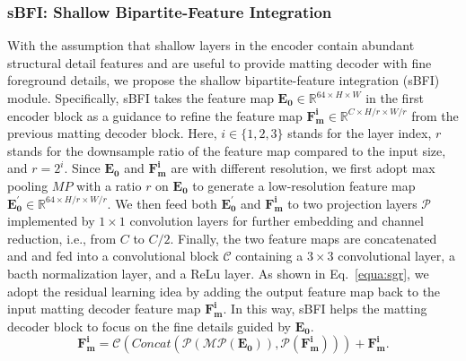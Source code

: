 \documentclass[twocolumn]{svjour3}
\begin{document}
\subsubsection{sBFI: Shallow Bipartite-Feature Integration}
With the assumption that shallow layers in the encoder contain abundant structural detail features and are useful to provide matting decoder with fine foreground details, we propose the shallow bipartite-feature integration (sBFI) module. Specifically, sBFI takes the feature map $\mathbf{E_0}\in \mathbb{R}^{64\times H \times W}$ in the first encoder block as a guidance to refine the feature map $\mathbf{F_m^i}\in\mathbb{R}^{C\times H/r \times W/r}$ from the previous matting decoder block. Here, $i\in \{1,2,3\}$ stands for the layer index, $r$ stands for the downsample ratio of the feature map compared to the input size, and $r=2^i$. Since $\mathbf{E_0}$ and $\mathbf{F_m^i}$ are with different resolution, we first adopt max pooling $MP$ with a ratio $r$ on $\mathbf{E_0}$ to generate a low-resolution feature map $\mathbf{E_0^{'}}\in \mathbb{R}^{64\times H/r \times W/r}$. We then feed both $\mathbf{E_0^{'}}$ and $\mathbf{F_m^i}$ to two projection layers $\mathcal{P}$ implemented by $1\times1$ convolution layers for further embedding and channel reduction, i.e., from $C$ to $C/2$. Finally, the two feature maps are concatenated and and fed into a convolutional block $\mathcal{C}$ containing a $3\times3$ convolutional layer, a bacth normalization layer, and a ReLu layer. As shown in Eq.~\ref{equa:sgr}, we adopt the residual learning idea by adding the output feature map back to the input matting decoder feature map $\mathbf{F_m^i}$. In this way, sBFI helps the matting decoder block to focus on the fine details guided by $\mathbf{E_0}$.
\begin{equation}
\mathbf{F_m^i} = \mathcal{C}(Concat(\mathcal{P}(\mathcal{MP}(\mathbf{E_0})),\mathcal{P}(\mathbf{F^i_m})))+\mathbf{F_m^i}.
\label{equa:sgr}
\end{equation}
\end{document}
